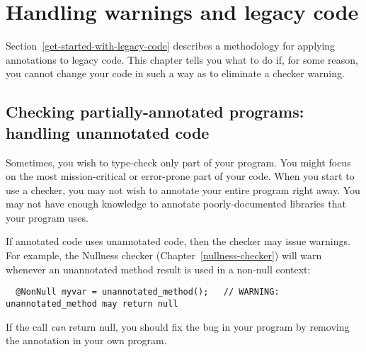 \htmlhr
\chapter{Handling warnings and legacy code\label{warnings-and-legacy}}

Section~\ref{get-started-with-legacy-code} describes a methodology for
applying annotations to legacy code.  This chapter tells you what to do if,
for some reason, you cannot change your code in such a way as to eliminate
a checker warning.


\section{Checking partially-annotated programs:  handling unannotated code\label{unannotated-code}}

Sometimes, you wish to type-check only part of your program.  
You might focus on the most mission-critical or error-prone part of your
code.  When you start to use a checker, you may not wish to annotate
your entire program right away.
You may not have 
enough knowledge to annotate poorly-documented libraries that your program uses.

If annotated code uses unannotated code, then the checker may issue
warnings.  For example, the Nullness checker (Chapter~\ref{nullness-checker}) will
warn whenever an unannotated method result is used in a non-null context:

\begin{Verbatim}
  @NonNull myvar = unannotated_method();   // WARNING: unannotated_method may return null
\end{Verbatim}

If the call \emph{can} return null, you should fix the bug in your program by
removing the  annotation in your own program.

